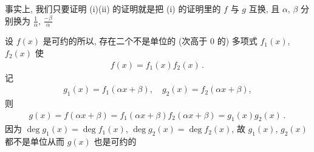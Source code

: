\begin{pf}
    事实上, 我们只要证明 (i)\period (ii) 的证明就是把 (i) 的证明里的 $f$ 与 $g$ 互换, 且 $\alpha$, $\beta$ 分别换为 $\frac{1}{\alpha}$, $\frac{-\beta}{\alpha}$\period

    设 $f(x)$ 是可约的\period 所以, 存在二个不是单位的 (次高于 $0$ 的) 多项式 $f_1 (x)$, $f_2 (x)$ 使
    \begin{align*}
        f(x) = f_1 (x) f_2 (x) \period
    \end{align*}
    记
    \begin{align*}
        g_1 (x) = f_1 (\alpha x + \beta), \quad g_2 (x) = f_2 (\alpha x + \beta),
    \end{align*}
    则
    \begin{align*}
        g(x) = f(\alpha x + \beta) = f_1 (\alpha x + \beta) f_2 (\alpha x + \beta) = g_1 (x) g_2 (x) \period
    \end{align*}
    因为 $\deg g_1 (x) = \deg f_1 (x)$, $\deg g_2 (x) = \deg f_2 (x)$, 故 $g_1 (x)$, $g_2 (x)$ 都不是单位\period 从而 $g(x)$ 也是可约的\period
\end{pf}

